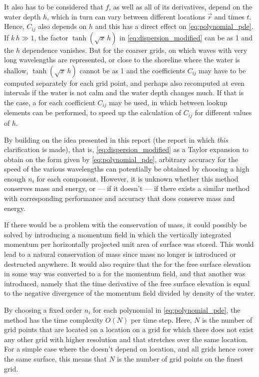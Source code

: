 It also has to be considered that $f$, as well as all of its derivatives, depend on the water depth $h$, which in turn can vary between different locations $\vec{r}$ and times $t$. Hence, $C_{ij}$ also depends on $h$ and this has a direct effect on \eqref{eq:polynomial_pde}. If $k\,h \gg 1$, the factor $\tanh(\sqrt{x}\,h)$ in \eqref{eq:dispersion_modified} can be \approximated as 1 and the $h$ dependence vanishes. But for the coarser grids, on which waves with very long wavelengths are represented, or close to the shoreline where the water is shallow, $\tanh(\sqrt{x}\,h)$ cannot be \approximated as 1 and the coefficients $C_{ij}$ may have to be computed separately for each grid point, and perhaps also recomputed at even intervals if the water is not calm and the water depth changes much. If that is the case, a  for each coefficient $C_{ij}$ may be used, in which \interpolation between lookup elements can be performed, to speed up the calculation of $C_{ij}$ for different values of $h$.

By building on the idea presented in this report (the report in which \emph{this} clarification is made), that is, \approximating \eqref{eq:dispersion_modified} as a Taylor expansion to obtain \PDEs on the form given by \eqref{eq:polynomial_pde}, arbitrary accuracy for the speed of the various wavelengths can potentially be obtained by choosing a high enough $n_i$ for each component. However, it is unknown whether this method conserves mass and energy, or --- if it doesn't --- if there exists a similar method with corresponding performance and accuracy that does conserve mass and energy.

If there would be a problem with the conservation of mass, it could possibly be solved by introducing a momentum field in which the vertically integrated momentum per horizontally projected unit area of surface was stored. This would lead to a natural conservation of mass since mass no longer is introduced or destructed anywhere. It would also require that the \PDE for the free surface elevation in some way was converted to a \PDE for the momentum field, and that another \PDE was introduced, namely that the time derivative of the free surface elevation is equal to the negative divergence of the momentum field divided by density of the water.

By choosing a fixed order $n_i$ for each polynomial in \eqref{eq:polynomial_pde}, the method has the time complexity $O(N)$ per time step. Here, $N$ is the number of grid points that are located on a location on a grid for which there does not exist any other grid with higher resolution and that stretches over the same location. For a simple case where the  doesn't depend on location, and all grids hence cover the same surface, this means that $N$ is the number of grid points on the finest grid.

